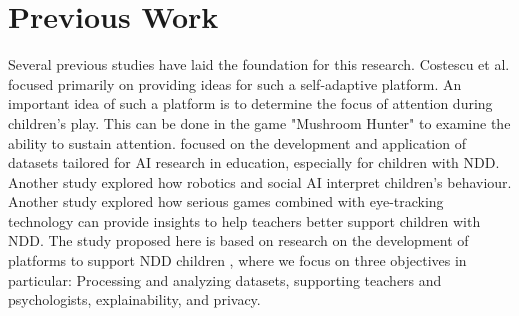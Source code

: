 \section{Previous Work}
Several previous studies have laid the foundation for this research. Costescu et al. \cite{costescu2020development} focused primarily on providing ideas for such a self-adaptive platform. An important idea of such a platform is to determine the focus of attention during children's play. This can be done in the game "Mushroom Hunter" to examine the ability to sustain attention. \cite{bueno2023datasets} focused on the development and application of datasets tailored for AI research in education, especially for children with NDD. Another study \cite{thill2022modelling} explored how robotics and social AI interpret children's behaviour. Another study \cite{daehlen2024towards} explored how serious games combined with eye-tracking technology can provide insights to help teachers better support children with NDD. The study proposed here is based on research on the development of platforms to support NDD children \cite{costescu2020development}, where we focus on three objectives in particular: Processing and analyzing datasets, supporting teachers and psychologists, explainability, and privacy.
